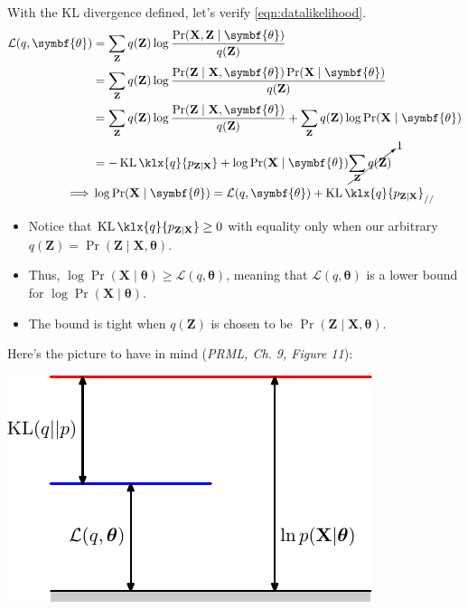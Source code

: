 \documentclass[11pt]{article}
\DeclareMathOperator{\KLsym}{KL}
\newcommand{\KL}{\KLsym\klx}
\begin{document}
With the KL divergence defined, let's verify \eqref{eqn:datalikelihood}.
\begin{align*}
  \mathcal{L}(q, \symbf{\theta}) &= \sum_{\mathbf{Z}} q(\mathbf{Z})
    \log \frac{\Pr(\mathbf{X}, \mathbf{Z} \mid \symbf{\theta})}{q(\mathbf{Z})} \\
    &= \sum_{\mathbf{Z}} q(\mathbf{Z}) \log \frac{
      \Pr(\mathbf{Z} \mid \mathbf{X}, \symbf{\theta})
      \Pr(\mathbf{X}\mid \symbf{\theta})}{q(\mathbf{Z})} \\
    &= \sum_{\mathbf{Z}} q(\mathbf{Z}) \log
      \frac{\Pr(\mathbf{Z} \mid \mathbf{X}, \symbf{\theta})}{q(\mathbf{Z})} +
      \sum_{\mathbf{Z}} q(\mathbf{Z}) \log\Pr(\mathbf{X}\mid \symbf{\theta})\\
    &= -\KL{q}{p_{\mathbf{Z}\mid\mathbf{X}}} +
      \log\Pr(\mathbf{X}\mid \symbf{\theta})
      \cancelto{1}{\sum_{\mathbf{Z}} q(\mathbf{Z})} \\
  \implies &\log\Pr(\mathbf{X}\mid \symbf{\theta}) =
    \mathcal{L}(q, \symbf{\theta}) + \KL{q}{p_{\mathbf{Z}\mid\mathbf{X}}} _{//}
\end{align*}

\begin{itemize}
\item Notice that $\KL{q}{p_{\mathbf{Z}\mid\mathbf{X}}} \geq 0$ with equality only
when our arbitrary $q(\mathbf{Z}) = \Pr(\mathbf{Z} \mid \mathbf{X},
\symbf{\theta})$.

\item Thus, ${\log\Pr(\mathbf{X}\mid\symbf{\theta})} \geq
\mathcal{L}(q, \symbf{\theta})$, meaning that $\mathcal{L}(q, \symbf{\theta})$
is a lower bound for $\log\Pr(\mathbf{X}\mid \symbf{\theta})$.

\item The bound is
tight when $q(\mathbf{Z})$ is chosen to be $\Pr(\mathbf{Z} \mid \mathbf{X},
\symbf{\theta})$.
\end{itemize}

Here's the picture to have in mind (\emph{PRML, Ch. 9, Figure 11}):
\begin{center}
  \includegraphics[scale=1]{Figure9-11.pdf}
\end{center}
\end{document}
